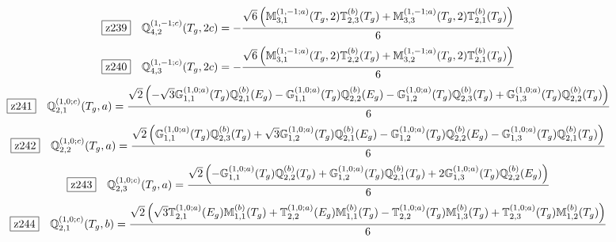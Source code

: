 \documentclass[fleqn,10pt,landscape]{jsarticle}
\begin{document}
\begin{dmath*}
\hspace*{3mm}\fbox{z239}\quad \mathbb{Q}_{4,2}^{(1,-1;c)}(T_{g},2c)=- \frac{\sqrt{6} \left(\mathbb{M}_{3,1}^{(1,-1;a)}(T_{g},2) \mathbb{T}_{2,3}^{(b)}(T_{g}) + \mathbb{M}_{3,3}^{(1,-1;a)}(T_{g},2) \mathbb{T}_{2,1}^{(b)}(T_{g})\right)}{6}
\end{dmath*}
\begin{dmath*}
\hspace*{3mm}\fbox{z240}\quad \mathbb{Q}_{4,3}^{(1,-1;c)}(T_{g},2c)=- \frac{\sqrt{6} \left(\mathbb{M}_{3,1}^{(1,-1;a)}(T_{g},2) \mathbb{T}_{2,2}^{(b)}(T_{g}) + \mathbb{M}_{3,2}^{(1,-1;a)}(T_{g},2) \mathbb{T}_{2,1}^{(b)}(T_{g})\right)}{6}
\end{dmath*}
\begin{dmath*}
\hspace*{3mm}\fbox{z241}\quad \mathbb{Q}_{2,1}^{(1,0;c)}(T_{g},a)=\frac{\sqrt{2} \left(- \sqrt{3} \mathbb{G}_{1,1}^{(1,0;a)}(T_{g}) \mathbb{Q}_{2,1}^{(b)}(E_{g}) - \mathbb{G}_{1,1}^{(1,0;a)}(T_{g}) \mathbb{Q}_{2,2}^{(b)}(E_{g}) - \mathbb{G}_{1,2}^{(1,0;a)}(T_{g}) \mathbb{Q}_{2,3}^{(b)}(T_{g}) + \mathbb{G}_{1,3}^{(1,0;a)}(T_{g}) \mathbb{Q}_{2,2}^{(b)}(T_{g})\right)}{6}
\end{dmath*}
\begin{dmath*}
\hspace*{3mm}\fbox{z242}\quad \mathbb{Q}_{2,2}^{(1,0;c)}(T_{g},a)=\frac{\sqrt{2} \left(\mathbb{G}_{1,1}^{(1,0;a)}(T_{g}) \mathbb{Q}_{2,3}^{(b)}(T_{g}) + \sqrt{3} \mathbb{G}_{1,2}^{(1,0;a)}(T_{g}) \mathbb{Q}_{2,1}^{(b)}(E_{g}) - \mathbb{G}_{1,2}^{(1,0;a)}(T_{g}) \mathbb{Q}_{2,2}^{(b)}(E_{g}) - \mathbb{G}_{1,3}^{(1,0;a)}(T_{g}) \mathbb{Q}_{2,1}^{(b)}(T_{g})\right)}{6}
\end{dmath*}
\begin{dmath*}
\hspace*{3mm}\fbox{z243}\quad \mathbb{Q}_{2,3}^{(1,0;c)}(T_{g},a)=\frac{\sqrt{2} \left(- \mathbb{G}_{1,1}^{(1,0;a)}(T_{g}) \mathbb{Q}_{2,2}^{(b)}(T_{g}) + \mathbb{G}_{1,2}^{(1,0;a)}(T_{g}) \mathbb{Q}_{2,1}^{(b)}(T_{g}) + 2 \mathbb{G}_{1,3}^{(1,0;a)}(T_{g}) \mathbb{Q}_{2,2}^{(b)}(E_{g})\right)}{6}
\end{dmath*}
\begin{dmath*}
\hspace*{3mm}\fbox{z244}\quad \mathbb{Q}_{2,1}^{(1,0;c)}(T_{g},b)=\frac{\sqrt{2} \left(\sqrt{3} \mathbb{T}_{2,1}^{(1,0;a)}(E_{g}) \mathbb{M}_{1,1}^{(b)}(T_{g}) + \mathbb{T}_{2,2}^{(1,0;a)}(E_{g}) \mathbb{M}_{1,1}^{(b)}(T_{g}) - \mathbb{T}_{2,2}^{(1,0;a)}(T_{g}) \mathbb{M}_{1,3}^{(b)}(T_{g}) + \mathbb{T}_{2,3}^{(1,0;a)}(T_{g}) \mathbb{M}_{1,2}^{(b)}(T_{g})\right)}{6}
\end{dmath*}
\end{document}
